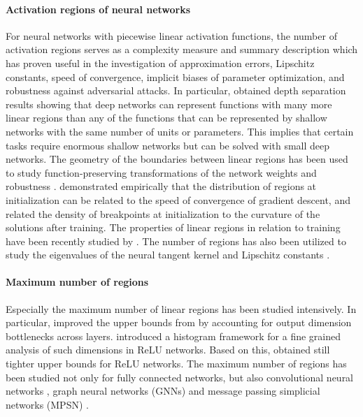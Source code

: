 \documentclass{article}
\theoremstyle{definition}
\begin{document}
\paragraph{Activation regions of neural networks} 
For neural networks with piecewise linear activation functions, the number of activation regions serves as a complexity measure and summary description which has proven useful in the investigation of approximation errors, Lipschitz constants, speed of convergence, implicit biases of parameter optimization, and robustness against adversarial attacks.
In particular, \citet{pascanu2013number,NIPS2014_5422,telgarsky2015representation,pmlr-v49-telgarsky16} obtained depth separation results showing that deep networks can represent functions with many more linear regions than any of the functions that can be represented by shallow networks with the same number of units or parameters. This implies that certain tasks require enormous shallow networks but can be solved with small deep networks.
The geometry of the boundaries between linear regions has been used to study function-preserving transformations of the network weights \citep{phuong2019functional, serra2020lossless}
and robustness \citep{pmlr-v89-croce19a, lee2019towards}. 
\citet{steinwart2019sober} demonstrated empirically that the distribution of regions at initialization can be related to the speed of convergence of gradient descent, and \citet{NEURIPS2019_1f6419b1,86441} related the density of breakpoints at initialization to the curvature of the solutions after training.
The properties of linear regions in relation to training have been recently studied by \citet{Zhang2020Empirical}.
The number of regions has also been utilized to study the eigenvalues of the neural tangent kernel and Lipschitz constants \citep{nguyen2020tight}.

\paragraph{Maximum number of regions}
Especially the maximum number of linear regions has been studied intensively. 
In particular, \citet{montufar2017notes,serra2018bounding} improved the upper bounds from \citet{NIPS2014_5422} by accounting for output dimension bottlenecks across layers.
\citet{hinz2019framework} introduced a histogram framework for a fine grained analysis of such dimensions in ReLU networks. Based on this, \citet{xie2020general, Hinz2021UsingAH} obtained still tighter upper bounds for ReLU networks.
The maximum number of regions has been studied not only for fully connected networks, but also convolutional neural networks \citep{xiong2020number}, graph neural networks (GNNs) and message passing simplicial networks (MPSN) \citep{bodnar2021weisfeiler}. 
\end{document}
